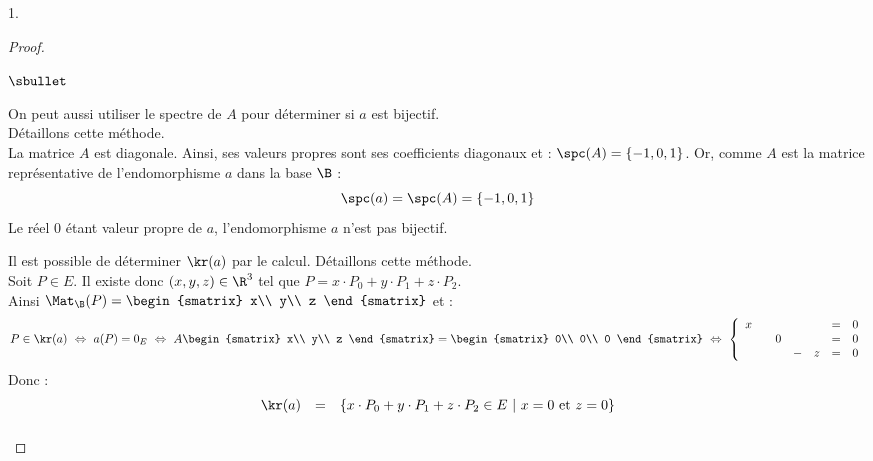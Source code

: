 \documentclass[11pt]{article}%
\begin{document}
\begin{noliste}{1.}
\begin{proof}
    \begin{remark}
      \begin{noliste}{$\sbullet$}
      \item On peut aussi utiliser le spectre de $A$ pour déterminer
        si $a$ est bijectif.\\
        Détaillons cette méthode.\\[.2cm]
        La matrice $A$ est diagonale. Ainsi, ses valeurs propres sont
        ses coefficients diagonaux et : $\spc(A) = \{-1,0,1\}$. Or,
        comme $A$ est la matrice représentative de l'endomorphisme $a$
        dans la base $\B$ :
        \[
        \spc(a) = \spc(A) = \{-1,0,1\}
        \]
        Le réel $0$ étant valeur propre de $a$, l'endomorphisme $a$ n'est
        pas bijectif.
      \item Il est possible de déterminer $\kr(a)$ par le
        calcul. Détaillons cette méthode.\\[.2cm]
        Soit $P \in E$. Il existe donc $(x, y, z) \in \R^3$ tel que $P
        = x \cdot P_0 + y \cdot P_1 + z \cdot P_2$.\\
        Ainsi $\Mat_{\B}(P) =
        \begin{smatrix}
          x\\ 
          y\\ 
          z
	\end{smatrix}$ et :
	\[
	P\in\kr(a) \ \Leftrightarrow \ a(P) = 0_{E} \ \Leftrightarrow
        \ A
	\begin{smatrix}
          x\\ 
          y\\ 
          z
	\end{smatrix}
	= 
	\begin{smatrix}
          0\\ 
          0\\ 
          0
	\end{smatrix} 
	\
	\Leftrightarrow
	\
	\left\{ 
          \begin{array}{rrrrrcl}
            x & & & & & = & 0\\
            & & 0 & & & = & 0\\
            & & & - & z & = & 0
          \end{array}
	\right.
	\]
	Donc :
	\[
	\begin{array}{rcl}
          \kr(a) & = & \left\{ 
            x \cdot P_0 + y \cdot P_1 + z \cdot P_2 \in E \ \vert \
            x=0
            \mbox{ et }
            z=0
          \right\}
          \\[.2cm]

\end{array}\]
\end{noliste}
\end{remark}
\end{proof}
\end{noliste}
\end{document}
